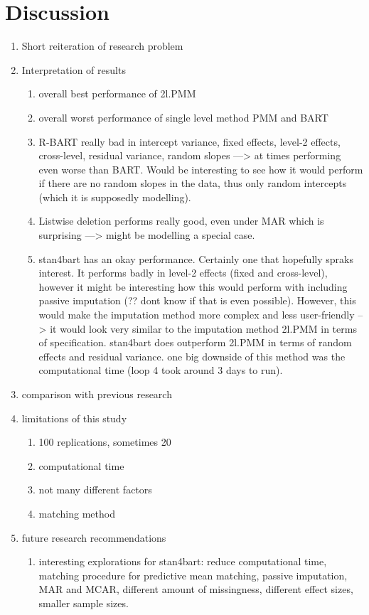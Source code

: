 \documentclass[10pt, a4paper, titlepage]{article}
\begin{document}
\section{Discussion}
\begin{enumerate}
    \item Short reiteration of research problem
    \item Interpretation of results
    \begin{enumerate}
        \item overall best performance of 2l.PMM 
        \item overall worst performance of single level method PMM and BART
        \item R-BART really bad in intercept variance, fixed effects, level-2 effects, cross-level, residual variance, random slopes ---> at times performing even worse than BART. Would be interesting to see how it would perform if there are no random slopes in the data, thus only random intercepts (which it is supposedly modelling). 
        \item Listwise deletion performs really good, even under MAR which is surprising ---> might be modelling a special case. 
        \item stan4bart has an okay performance. Certainly one that hopefully spraks interest. It performs badly in level-2 effects (fixed and cross-level), however it might be interesting how this would perform with including passive imputation (?? dont know if that is even possible). However, this would make the imputation method more complex and less user-friendly --> it would look very similar to the imputation method 2l.PMM in terms of specification. stan4bart does outperform 2l.PMM in terms of random effects and residual variance. one big downside of this method was the computational time (loop 4 took around 3 days to run).
    \end{enumerate}
    \item comparison with previous research 
    \item limitations of this study
    \begin{enumerate}
        \item 100 replications, sometimes 20
        \item computational time 
        \item not many different factors
        \item matching method 
    \end{enumerate}
    \item future research recommendations
    \begin{enumerate}
        \item interesting explorations for stan4bart: reduce computational time, matching procedure for predictive mean matching, passive imputation, MAR and MCAR, different amount of missingness, different effect sizes, smaller sample sizes.
    \end{enumerate}
\end{enumerate}
\end{document}
